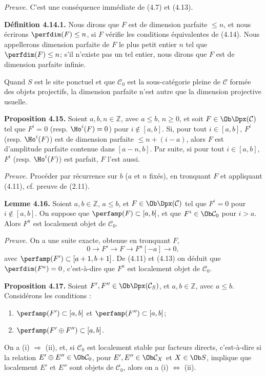 \documentclass[11pt]{article}
\begin{document}
\emph{Preuve.} C'est une conséquence immédiate de (4.7) et (4.13).

\textbf{Définition 4.14.1.} Nous dirons que \(F\) est de dimension parfaite \(\leq n\), et nous écrirons \(\perfdim(F)\leq n\), si \(F\) vérifie les conditions équivalentes de (4.14). Nous appellerons dimension parfaite de \(F\) le plus petit entier \(n\) tel que \(\perfdim(F)\leq n\); s'il n'existe pas un tel entier, nous dirons que \(F\) est de dimension parfaite infinie.

Quand \(S\) est le site ponctuel et que \(\mathcal C_0\) est la sous-catégorie pleine de \(\mathcal C\) formée des objets projectifs, la dimension parfaite n'est autre que la dimension projective usuelle.

\textbf{Proposition 4.15.} Soient \(a,b,n\in\mathbb Z\), avec \(a\leq b\), \(n\geq0\), et soit \(F\in\Ob\Dpx(\mathcal C)\) tel que \(F^i=0\) (resp. \(\Ho^i(F)=0\)) pour \(i\notin[a,b]\). Si, pour tout \(i\in[a,b]\), \(F^i\) (resp. \(\Ho^i(F)\)) est de dimension parfaite \(\leq n+(i-a)\), alors \(F\) est d'amplitude parfaite contenue dans \([a-n,b]\). Par suite, si pour tout \(i\in[a,b]\), \(F^i\) (resp. \(\Ho^i(F)\)) est parfait, \(F\) l'est aussi.

\emph{Preuve.} Procéder par récurrence sur \(b\) (\(a\) et \(n\) fixés), en tronquant \(F\) et appliquant (4.11), cf. preuve de (2.11).

\textbf{Lemme 4.16.} Soient \(a,b\in\mathbb Z\), \(a\leq b\), et \(F\in\Ob\Dpx(\mathcal C)\) tel que \(F^i=0\) pour \(i\notin[a,b]\). On suppose que \(\perfamp(F)\subset[a,b]\), et que \(F^i\in\Ob\mathcal C_0\) pour \(i>a\). Alors \(F^a\) est localement objet de \(\mathcal C_0\).

\emph{Preuve.} On a une suite exacte, obtenue en tronquant \(F\),
\[
  0\longrightarrow F'\longrightarrow F\longrightarrow F^a[-a]\longrightarrow 0,
\]
avec \(\perfamp(F')\subset[a+1,b+1]\). De (4.11) et (4.13) on déduit que \(\perfdim(F^a)=0\), c'est-à-dire que \(F^a\) est localement objet de \(\mathcal C_0\).

\textbf{Proposition 4.17.} Soient \(F',F''\in\Ob\Dpx(\mathcal C_S)\), et \(a,b\in\mathbb Z\), avec \(a\leq b\). Considérons les conditions :
\begin{enumerate}[label=(\roman*)]
\item \(\perfamp(F')\subset[a,b]\) et \(\perfamp(F'')\subset[a,b]\);
\item \(\perfamp(F'\oplus F'')\subset[a,b]\).
\end{enumerate}
On a (i) \(\Rightarrow\) (ii), et, si \(\mathcal C_0\) est localement stable par facteurs directs, c'est-à-dire si la relation \(E'\oplus E''\in\Ob\mathcal C_0\), pour \(E',E''\in\Ob\mathcal C_X\) et \(X\in\Ob S\), implique que localement \(E'\) et \(E''\) sont objets de \(\mathcal C_0\), alors on a (i) \(\Leftrightarrow\) (ii).
\end{document}
